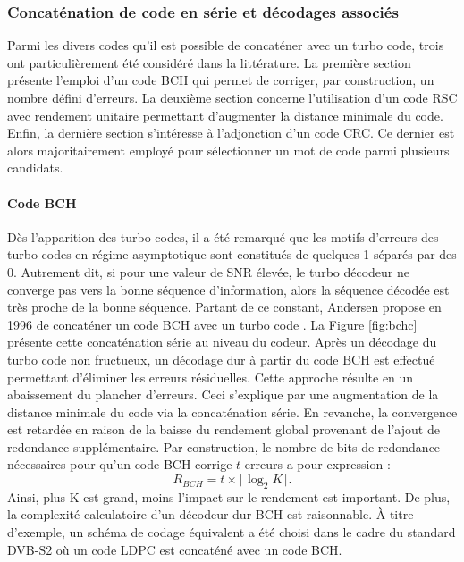 
\subsubsection{Concaténation de code en série et décodages associés}
Parmi les divers codes qu'il est possible de concaténer avec un turbo code, trois ont particulièrement été considéré 
dans la littérature. La première section présente l'emploi d'un code BCH qui permet de corriger, par construction, un 
nombre défini d'erreurs. La deuxième section concerne l'utilisation d'un code RSC avec rendement unitaire permettant 
d'augmenter la distance minimale du code. Enfin, la dernière section s'intéresse à l'adjonction d'un code CRC. Ce 
dernier est alors majoritairement employé pour sélectionner un mot de code parmi plusieurs candidats.
\paragraph{Code BCH}
Dès l'apparition des turbo codes, il a été remarqué que les motifs d'erreurs des turbo codes en régime asymptotique sont 
constitués de quelques 1 séparés par des 0. Autrement dit, si pour une valeur de SNR élevée, le turbo décodeur ne 
converge pas vers la bonne séquence d'information, alors la séquence décodée est très proche de la bonne séquence. 
Partant de ce constant, Andersen propose en 1996 de concaténer un code BCH avec un turbo code \cite{andersenBCH}. La 
Figure \ref{fig:bchc} présente cette concaténation série au niveau du codeur. Après un décodage du turbo code non 
fructueux, un décodage dur à partir du code BCH est effectué permettant d'éliminer les erreurs résiduelles. Cette 
approche résulte en un abaissement du plancher d'erreurs. Ceci s'explique par une augmentation de la distance minimale 
du code via la concaténation série. En revanche, la convergence est retardée en raison de la baisse du rendement global 
provenant de l'ajout de redondance supplémentaire. Par construction, le nombre de bits de redondance nécessaires pour 
qu'un code BCH corrige $t$ erreurs a pour expression : \[R_{BCH} = t \times \lceil \log_2 K\rceil.\]
Ainsi, plus K est grand, moins l'impact sur le rendement est important. De plus, la complexité calculatoire d'un 
décodeur dur BCH est raisonnable. À titre d'exemple, un schéma de codage équivalent a été choisi dans le cadre du 
standard DVB-S2 où  un code LDPC est concaténé avec un code BCH.

